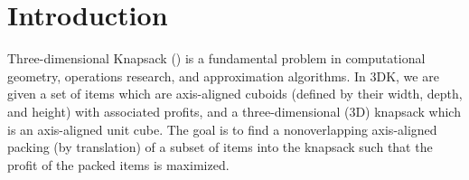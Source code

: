 \newcommand{\drawGreenCuboidDashed}[7][$ $]{\draw[color=greenItem!75!black,dashed] (#2,#3,#4) -- (#2+#5,#3,#4);
	\draw[color=greenItem!75!black,dashed] (#2,#3,#4)-- (#2,#3+#6,#4);
	\draw[color=greenItem!75!black,dashed] (#2,#3,#4) -- (#2,#3,#4+#7);
	\draw[color=greenItem!75!black] (#2+#5,#3,#4) -- (#2+#5,#3+#6,#4);
	\draw[color=greenItem!75!black] (#2+#5,#3,#4) -- (#2+#5,#3,#4+#7);
	\draw[color=greenItem!75!black] (#2,#3+#6,#4) -- (#2,#3+#6,#4+#7);
	\draw[color=greenItem!75!black] (#2,#3+#6,#4) -- (#2+#5,#3+#6,#4);
	\draw[color=greenItem!75!black] (#2+#5,#3+#6,#4) -- (#2+#5,#3+#6,#4+#7);
	\draw[color=greenItem!75!black] (#2,#3+#6,#4+#7) -- (#2+#5,#3+#6,#4+#7);
	\draw[color=greenItem!75!black] (#2+#5,#3,#4+#7) -- (#2+#5,#3+#6,#4+#7);
	\draw[color=greenItem!75!black] (#2,#3,#4+#7) -- (#2+#5,#3,#4+#7);
	\draw[color=greenItem!75!black] (#2,#3,#4+#7) -- (#2,#3+#6,#4+#7);
	\node at (#2+0.5*#5, #3+0.5*#6, #4+0.5*#7) {#1};
}

\section{Introduction}
Three-dimensional Knapsack (\tdk) is a fundamental problem in computational geometry, operations research, and approximation algorithms. 
In 3DK, we are given a set of items which are axis-aligned cuboids (defined by their width, depth, and height) with associated profits, and a three-dimensional (3D) knapsack which is an axis-aligned unit cube. The goal is to find a nonoverlapping axis-aligned packing (by translation) of a subset of items into the knapsack such that the profit of the packed items is maximized. 

